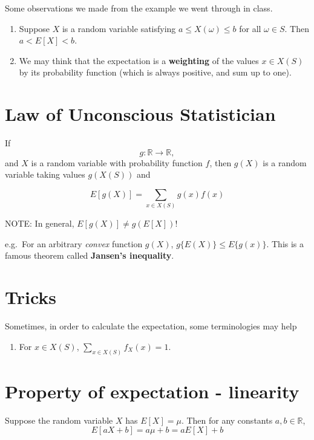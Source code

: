 \documentclass[
]{book}
\providecommand{\tightlist}{%
  \setlength{\itemsep}{0pt}\setlength{\parskip}{0pt}}
\theoremstyle{definition}
\theoremstyle{definition}
\theoremstyle{definition}
\theoremstyle{definition}
\theoremstyle{remark}
\begin{document}
Some observations we made from the example we went through in class.

\begin{enumerate}
\def\labelenumi{\arabic{enumi}.}
\item
  Suppose \(X\) is a random variable satisfying \(a \le X(\omega) \le b\) for all \(\omega \in S\). Then \(a<E[X]<b\).
\item
  We may think that the expectation is a \textbf{weighting} of the values \(x\in X(S)\) by its probability function (which is always positive, and sum up to one).
\end{enumerate}

\section{Law of Unconscious Statistician}\label{law-of-unconscious-statistician}

If
\[
g: {\mathbb R} \to {\mathbb R},
\]
and \(X\) is a random variable with probability function \(f\), then \(g(X)\) is a random variable taking values \(g(X(S))\) and

\[
E[g(X)] = \sum_{x \in X(S)} g(x) f(x)
\]

NOTE: In general, \(E[g(X)]\ne g(E[X])\)!

e.g.~For an arbitrary \emph{convex} function \(g(X)\), \(g\{E(X)\} \le E\{g(x)\}\). This is a famous theorem called \textbf{Jansen's inequality}.

\section{Tricks}\label{tricks}

Sometimes, in order to calculate the expectation, some terminologies may help

\begin{enumerate}
\def\labelenumi{\arabic{enumi}.}
\tightlist
\item
  For \(x\in X(S)\), \(\sum_{x\in X(S)} f_X(x)=1\).
\end{enumerate}

\section{Property of expectation - linearity}\label{property-of-expectation---linearity}

Suppose the random variable \(X\) has \(E[X]=\mu\). Then for any constants \(a,b\in\mathbb{R}\),
\[ E[aX+b]= a \mu + b = a E[X]+b\]
\end{document}
